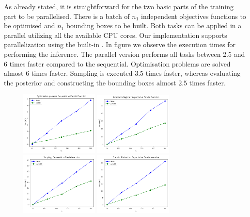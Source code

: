 As already stated, it is straightforward for the two basic parts of
the training part to be parallelised. There is a batch of $n_1$
independent objectives functions to be optimised and $n_1$ bounding
boxes to be built. Both tasks can be applied in a parallel utilizing
all the available CPU cores. Our implementation supports
parallelization using the built-in 
. In figure \label{fig:exec_parallel} we observe the
execution times for performing the inference. The parallel version
performs all tasks between 2.5 and 6 times faster compared to the
sequential. Optimisation problems are solved almost 6 times
faster. Sampling is executed 3.5 times faster, whereas evaluating the
posterior and constructing the bounding boxes almost 2.5 times faster.

\begin{figure}[ht]
    \begin{center}
      \includegraphics[width=0.35\textwidth]{./latex_files/images/chapter4/solve_problems_parallel.png}
      \includegraphics[width=0.35\textwidth]{./latex_files/images/chapter4/estimate_regions_parallel.png}\\
      \includegraphics[width=0.35\textwidth]{./latex_files/images/chapter4/sample_parallel.png}
      \includegraphics[width=0.35\textwidth]{./latex_files/images/chapter4/eval_post_parallel.png}


\end{center}
\end{figure}
